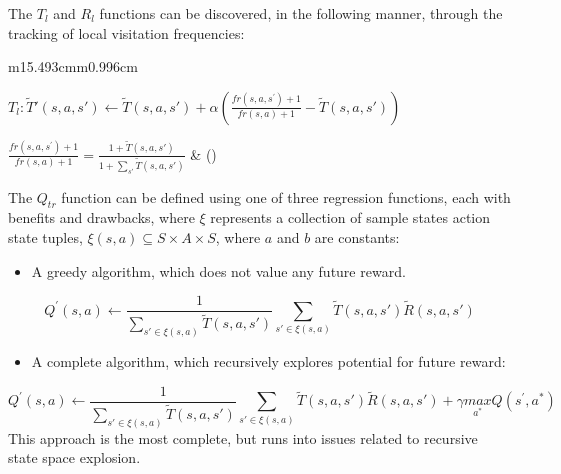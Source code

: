 \documentclass{article}
\makeatletter
\newcommand\arraybslash{\let\\\@arraycr}
\newcounter{Equation}
\renewcommand\theEquation{\arabic{Equation}}
\makeatother
\begin{document}
The  $T_l$ and  $R_l$ functions can be discovered, in the following manner, through the tracking of local visitation frequencies:

\begin{flushleft}
\tablefirsthead{}
\tablehead{}
\tabletail{}
\tablelasttail{}
\begin{supertabular}{m{15.493cm}m{0.996cm}}
{\centering  $T_l:\widetilde T'\left(s,a,s'\right)\leftarrow \widetilde T\left(s,a,s'\right)+\alpha \left(\frac{\mathit{fr}\left(s,a,s^'\right)+1}{\mathit{fr}\left(s,a\right)+1}-\widetilde T\left(s,a,s'\right)\right)$\par}

\centering  $\frac{\mathit{fr}\left(s,a,s^'\right)+1}{\mathit{fr}\left(s,a\right)+1}=\frac{1+\widetilde T\left(s,a,s'\right)}{1+\sum _{s'}^{}\widetilde T\left(s,a,s'\right)}$ &
\centering\arraybslash (\stepcounter{Equation}{\theEquation})\\
\end{supertabular}
\end{flushleft}

\bigskip

The  $Q_{\mathit{tr}}$ function can be defined using one of three regression functions, each with benefits and drawbacks, where  $\xi $ represents a collection of sample states action state tuples,  $\xi \left(s,a\right){\subseteq}S\times A\times S$, where  $a$ and  $b$ are constants:

\begin{itemize}
\item A greedy algorithm, which does not value any future reward.
\end{itemize}
\begin{equation}
Q^'(s,a)\leftarrow \frac 1{\sum _{s'{\in}\xi (s,a)}^{}\widetilde T\left(s,a,s'\right)}\sum _{s'{\in}\xi (s,a)}^{}\widetilde T\left(s,a,s'\right)\widetilde R\left(s,a,s'\right)
\end{equation}
\begin{itemize}
\item A complete algorithm, which recursively explores potential for future reward:
\end{itemize}
\begin{equation}
Q^'(s,a)\leftarrow \frac 1{\sum _{s'{\in}\xi (s,a)}^{}\widetilde T\left(s,a,s'\right)}\sum _{s'{\in}\xi (s,a)}^{}\widetilde T\left(s,a,s'\right)\widetilde R\left(s,a,s'\right)+\gamma \underset{a^{\ast }}{\mathit{max}}Q(s^',a^{\ast })
\end{equation}
This approach is the most complete, but runs into issues related to recursive state space explosion.
\end{document}
